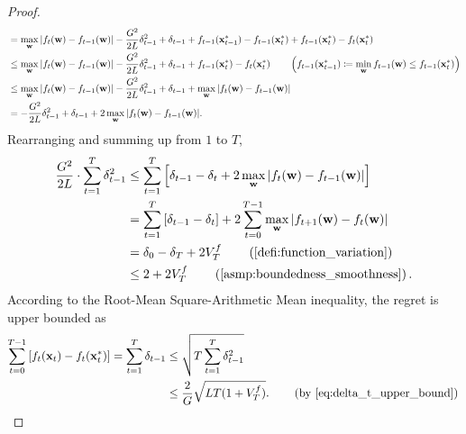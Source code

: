 \begin{proof}
\begin{equation*}
\begin{split}
    &= \max\limits_{{\mathbf{w}}}{\left| f_{t}({\mathbf{w}}) - f_{t-1}({\mathbf{w}}) \right| } - \frac{G^2}{2L} \delta_{t-1}^2 + \delta_{t-1} + f_{t-1}({\mathbf{x}}_{t-1}^*) - f_{t-1}({\mathbf{x}}_{t}^*) + f_{t-1}({\mathbf{x}}_{t}^*) - f_t( {\mathbf{x}}_t^*) \\
    &\le \max\limits_{{\mathbf{w}}}{\left| f_{t}({\mathbf{w}}) - f_{t-1}({\mathbf{w}}) \right| } - \frac{G^2}{2L} \delta_{t-1}^2 + \delta_{t-1} + f_{t-1}({\mathbf{x}}_{t}^*) - f_t( {\mathbf{x}}_t^*) \qquad \left(f_{t-1}({\mathbf{x}}_{t-1}^*) \coloneqq \min\limits_{{\mathbf{w}}}{f_{t-1}({\mathbf{w}})} \le f_{t-1}({\mathbf{x}}_t^*) \right) \\
    &\le \max\limits_{{\mathbf{w}}}{\left| f_{t}({\mathbf{w}}) - f_{t-1}({\mathbf{w}}) \right| } - \frac{G^2}{2L} \delta_{t-1}^2 + \delta_{t-1} + \max\limits_{{\mathbf{w}}}{\left| f_{t}({\mathbf{w}}) - f_{t-1}({\mathbf{w}}) \right| } \\
    &= - \frac{G^2}{2L} \delta_{t-1}^2 + \delta_{t-1} + 2 \max\limits_{{\mathbf{w}}}{\left| f_{t}({\mathbf{w}}) - f_{t-1}({\mathbf{w}}) \right| }.
\end{split}
\end{equation*}
Rearranging and summing up from $1$ to $T$,
\begin{equation}
\label{eq:delta_t_upper_bound}
\begin{split}
    \frac{G^2}{2L} \cdot \sum\limits_{t=1}^{T}{ \delta_{t-1}^2} &\le \sum\limits_{t=1}^{T}{\left[ \delta_{t-1} - \delta_{t} + 2 \max\limits_{\rvw}{\left| f_{t}(\rvw) - f_{t-1}(\rvw) \right|} \right] } \\
    &= \sum\limits_{t=1}^{T}{ \left[ \delta_{t-1} - \delta_{t} \right] } + 2 \sum\limits_{t=0}^{T-1}{ \max\limits_{\rvw}{\left| f_{t+1}(\rvw) - f_{t}(\rvw) \right| } } \\
    &= \delta_0 - \delta_{T} + 2 V_T^f \qquad \left( \text{\cref{defi:function_variation}} \right) \\
    &\le 2 + 2 V_T^f \qquad \left(\text{\cref{asmp:boundedness_smoothness}}\right).
\end{split}
\end{equation}
According to the Root-Mean Square-Arithmetic Mean inequality, the regret is upper bounded as
\begin{equation*}
\begin{split}
    \sum\limits_{t=0}^{T-1}{\left[ f_t(\rvx_t) - f_t( \rvx_t^*) \right]} = \sum\limits_{t=1}^{T}{ \delta_{t-1}} &\le \sqrt{T \sum\limits_{t=1}^{T}{ \delta_{t-1}^2}} \\
    &\le \frac{2}{G} \sqrt{L T ( 1 + V_T^f)}. \qquad \left(\text{by \cref{eq:delta_t_upper_bound}}\right) \qedhere
\end{split}
\end{equation*}
\end{proof}

